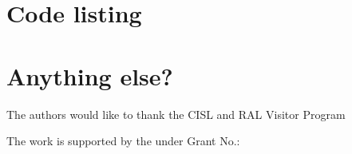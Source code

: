 %




\appendix
\section{Code listing}
\section{Anything else?}

\begin{acks}
  The authors would like to thank the CISL and RAL Visitor Program

  The work is
  supported by the  under Grant
  No.:~

\end{acks}
